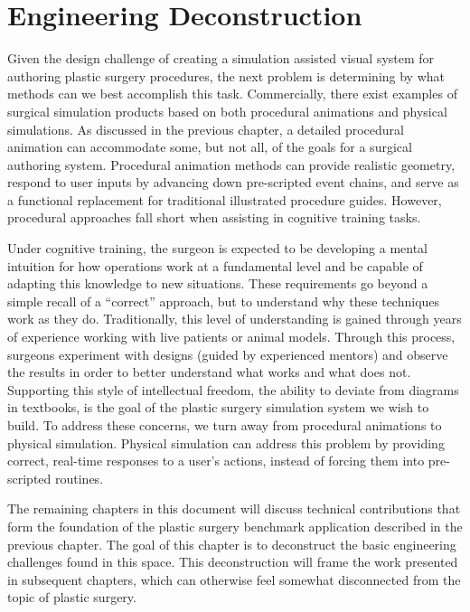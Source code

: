 
\chapter{Engineering Deconstruction}
\label{chp:engineering}

Given the design challenge of creating a simulation assisted visual
system for authoring plastic surgery procedures, the next problem is
determining by what methods can we best accomplish this
task. Commercially, there exist examples of surgical simulation
products based on both procedural animations and physical
simulations. As discussed in the previous chapter, a detailed
procedural animation can accommodate some, but not all, of the goals
for a surgical authoring system. Procedural animation methods can
provide realistic geometry, respond to user inputs by advancing down
pre-scripted event chains, and serve as a functional replacement for
traditional illustrated procedure guides. However, procedural approaches
fall short when assisting in cognitive training tasks.

Under cognitive training, the surgeon is expected to be developing a
mental intuition for how operations work at a fundamental level and be
capable of adapting this knowledge to new situations. These
requirements go beyond a simple recall of a ``correct'' approach, but
to understand why these techniques work as they do. Traditionally,
this level of understanding is gained through years of experience
working with live patients or animal models. Through this process,
surgeons experiment with designs (guided by experienced mentors) and
observe the results in order to better understand what works and what
does not. Supporting this style of intellectual freedom, the
ability to deviate from diagrams in textbooks, is the goal of the
plastic surgery simulation system we wish to build. To address these
concerns, we turn away from procedural animations to physical
simulation. Physical simulation can address this problem by
providing correct, real-time responses to a user's actions, instead of
forcing them into pre-scripted routines.

The remaining chapters in this document will discuss technical
contributions that form the foundation of the plastic surgery
benchmark application described in the previous chapter. The goal of
this chapter is to deconstruct the basic engineering challenges found
in this space. This deconstruction will frame the work presented in
subsequent chapters, which can otherwise feel somewhat disconnected
from the topic of plastic surgery.

